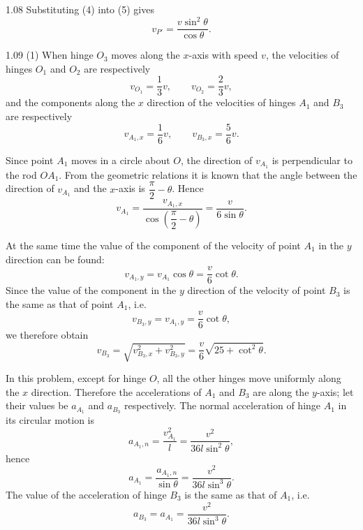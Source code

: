\begin{solution}{1.08}
Substituting (4) into (5) gives
\[
v_{P'}=\frac{v\sin^2\theta}{\cos\theta}.
\]
\end{solution}

\begin{solution}{1.09}
(1) When hinge $O_3$ moves along the $x$-axis with speed $v$, the velocities of hinges $O_1$ and
$O_2$ are respectively
\begin{equation*}
v_{O_1} = \frac{1}{3}v,\qquad v_{O_2} = \frac{2}{3}v,
\end{equation*}
and the components along the $x$ direction of the velocities of hinges $A_1$ and $B_3$ are
respectively
\begin{equation*}
v_{A_1,x} = \frac{1}{6}v,\qquad v_{B_3,x} = \frac{5}{6}v.
\end{equation*}

Since point $A_1$ moves in a circle about $O$, the direction of $v_{A_1}$ is perpendicular to the
rod $OA_1$. From the geometric relations it is known that the angle between the direction of
$v_{A_1}$ and the $x$-axis is $\dfrac{\pi}{2}-\theta$. Hence
\begin{equation}
v_{A_1} = \frac{v_{A_1,x}}{\cos\left(\dfrac{\pi}{2}-\theta\right)}
= \frac{v}{6\sin\theta}. \tag{1}
\end{equation}

At the same time the value of the component of the velocity of point $A_1$ in the $y$ direction
can be found:
\begin{equation*}
v_{A_1,y} = v_{A_1}\cos\theta = \frac{v}{6}\cot\theta.
\end{equation*}
Since the value of the component in the $y$ direction of the velocity of point $B_3$ is the same
as that of point $A_1$, i.e.
\begin{equation*}
v_{B_3,y} = v_{A_1,y} = \frac{v}{6}\cot\theta,
\end{equation*}
we therefore obtain
\begin{equation}
v_{B_3} = \sqrt{v_{B_3,x}^2+v_{B_3,y}^2}
= \frac{v}{6}\sqrt{25+\cot^2\theta}. \tag{2}
\end{equation}

In this problem, except for hinge $O$, all the other hinges move uniformly along the $x$
direction. Therefore the accelerations of $A_1$ and $B_3$ are along the $y$-axis; let their
values be $a_{A_1}$ and $a_{B_3}$ respectively. The normal acceleration of hinge $A_1$ in its
circular motion is
\begin{equation}
a_{A_1,n} = \frac{v_{A_1}^2}{l} = \frac{v^2}{36l\sin^2\theta}, \tag{3}
\end{equation}
hence
\begin{equation}
a_{A_1} = \frac{a_{A_1,n}}{\sin\theta} = \frac{v^2}{36l\sin^3\theta}. \tag{4}
\end{equation}
The value of the acceleration of hinge $B_3$ is the same as that of $A_1$, i.e.
\begin{equation*}
a_{B_3} = a_{A_1} = \frac{v^2}{36l\sin^3\theta}.
\end{equation*}


\end{solution}
